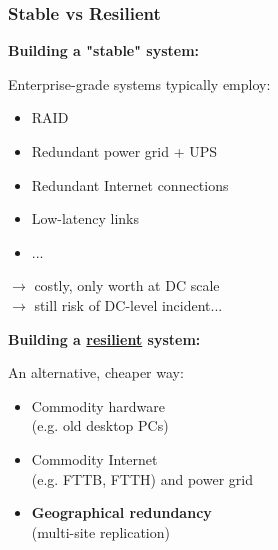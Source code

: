 \documentclass[aspectratio=169]{beamer}
\begin{document}
\begin{frame}
	\frametitle{Stable vs Resilient}

	\hspace{1em}
	\begin{minipage}{7cm}
		\textbf{Building a "stable" system:}
		\vspace{1em}

		Enterprise-grade systems typically employ:
		\vspace{1em}
		\begin{itemize}
			\item RAID
			\item Redundant power grid + UPS
			\item Redundant Internet connections
			\item Low-latency links
			\item ... 
		\end{itemize}
		\vspace{1em}
		$\to$ costly, only worth at DC scale\\
		$\to$ still risk of DC-level incident...
	\end{minipage}
	\hfill
	\begin{minipage}{7cm}
		\textbf{Building a \underline{resilient} system:}
		\vspace{1em}

		An alternative, cheaper way:
		\vspace{1em}
		\begin{itemize}
			\item Commodity hardware \\(e.g. old desktop PCs)
				\vspace{.5em}
			\item Commodity Internet \\(e.g. FTTB, FTTH) and power grid
				\vspace{.5em}
			\item \textbf{Geographical redundancy} \\(multi-site replication)
		\end{itemize}
		\vspace{1.5em}
	\end{minipage}
	\hspace{1em}
\end{frame}
\end{document}
